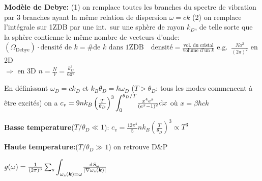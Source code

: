 \begin{squishlist}
    \item \textbf{Modèle de Debye:} (1) on remplace toutes les branches du spectre de vibration par 3 branches ayant la même relation de dispersion $\omega = ck$
    (2) on remplace l'intégrale sur 1ZDB par une int.\ sur une sphère de rayon $k_D$, de telle sorte que la sphère contienne le même nombre de vecteurs d'onde: \\
    $\left( \Omega_{\text{Debye}} \right) \cdot \text{densité de }k = \# \text{de } k \text{ dans 1ZDB}\quad \text{densité}=\frac{\text{vol.\ du cristal}}{\text{volume d'un }k}$ e.g.\ $\frac{N a^2}{(2\pi)^2}$ en 2D \\
    $\Longrightarrow$ en 3D $n = \frac{N}{V} = \frac{k_D^3}{6\pi^2}$
    \item En définissant $\omega_D = ck_D$ et $k_B \theta_D = \hbar \omega_D$ ($T > \theta_D$: tous les modes commencent à être excités) on a
    $c_v = 9 n k_B \left(\frac{T}{\theta_D}\right)^3 {\displaystyle \int_0^{\theta_D/T}} \frac{x^4 e^x}{(e^x - 1)^2} \textrm{d} x$ où $x = \beta \hbar c k$
    \item \textbf{Basse temperature}($T/\theta_D \ll 1$): $c_v = \frac{12\pi^4}{5} n k_B \left( \frac{T}{\theta_D}\right)^3 \propto T^3$
    \item \textbf{Haute temperature:}($T/\theta_D \gg 1$) on retrouve D\&P
\end{squishlist}

\begin{squishlist}
    \item $g(\omega) = \frac{1}{(2\pi)^3} \sum_s {\displaystyle \int_{\omega_s(\bm{k}) = \omega}} \frac{\textrm{d} S_{\omega}}{|\nabla \omega_s(\bm{k})|}$
\end{squishlist}

